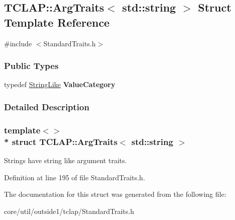 \hypertarget{structTCLAP_1_1ArgTraits_3_01std_1_1string_01_4}{}\subsection{T\+C\+L\+AP\+:\+:Arg\+Traits$<$ std\+:\+:string $>$ Struct Template Reference}
\label{structTCLAP_1_1ArgTraits_3_01std_1_1string_01_4}


{\ttfamily \#include $<$Standard\+Traits.\+h$>$}

\subsubsection*{Public Types}
\begin{DoxyCompactItemize}
\item 
typedef \hyperlink{structTCLAP_1_1StringLike}{String\+Like} {\bfseries Value\+Category}\hypertarget{structTCLAP_1_1ArgTraits_3_01std_1_1string_01_4_a719adeb18786516dd4b2a16525cf4536}{}\label{structTCLAP_1_1ArgTraits_3_01std_1_1string_01_4_a719adeb18786516dd4b2a16525cf4536}

\end{DoxyCompactItemize}


\subsubsection{Detailed Description}
\subsubsection*{template$<$$>$\\*
struct T\+C\+L\+A\+P\+::\+Arg\+Traits$<$ std\+::string $>$}

Strings have string like argument traits. 

Definition at line 195 of file Standard\+Traits.\+h.



The documentation for this struct was generated from the following file\+:\begin{DoxyCompactItemize}
\item 
core/util/outside1/tclap/Standard\+Traits.\+h\end{DoxyCompactItemize}
